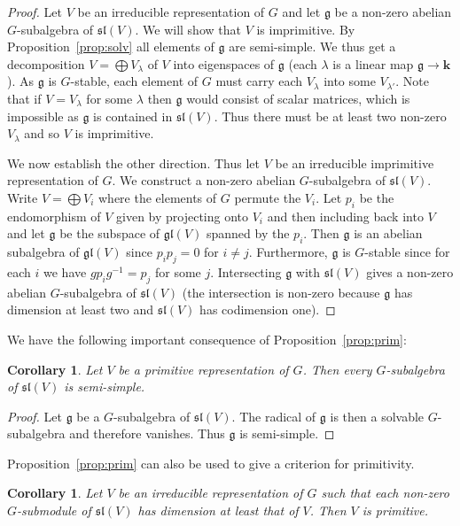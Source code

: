 \documentclass{amsart}
\newtheorem{corollary}[theorem]{Corollary}
\theoremstyle{definition}
\theoremstyle{remark}
\def\fieldk{\mathbf{k}}
\let\mf\mathfrak
\begin{document}
\begin{proof}
Let $V$ be an irreducible representation of $G$ and let $\mf{g}$ be a non-zero abelian $G$-subalgebra of $\mf{sl}(V)$.
We will show that $V$ is imprimitive.  By Proposition~\ref{prop:solv} all elements of $\mf{g}$ are semi-simple.  We
thus get a decomposition $V=\bigoplus V_{\lambda}$ of $V$ into eigenspaces of $\mf{g}$ (each $\lambda$ is a linear map
$\mf{g} \to \fieldk$).  As $\mf{g}$ is $G$-stable, each element of $G$ must carry each $V_{\lambda}$ into some
$V_{\lambda'}$.  Note that if $V=V_{\lambda}$ for some $\lambda$ then $\mf{g}$ would consist of scalar matrices, which
is impossible as $\mf{g}$ is contained in $\mf{sl}(V)$.  Thus there must be at least two non-zero $V_{\lambda}$ and so
$V$ is imprimitive.

We now establish the other direction.  Thus let $V$ be an irreducible imprimitive representation of $G$.  We construct
a non-zero abelian $G$-subalgebra of $\mf{sl}(V)$.  Write $V=\bigoplus V_i$ where the elements of $G$ permute the $V_i$.
Let $p_i$ be the endomorphism of $V$ given by projecting onto $V_i$ and then including back into $V$ and let $\mf{g}$ be
the subspace of $\mf{gl}(V)$ spanned by the $p_i$.  Then $\mf{g}$ is an abelian subalgebra of $\mf{gl}(V)$ since
$p_i p_j=0$ for $i \ne j$.  Furthermore, $\mf{g}$ is $G$-stable since for each $i$ we have $g p_i g^{-1}=p_j$ for some
$j$.  Intersecting $\mf{g}$ with $\mf{sl}(V)$ gives a non-zero abelian $G$-subalgebra of $\mf{sl}(V)$ (the intersection
is non-zero because $\mf{g}$ has dimension at least two and $\mf{sl}(V)$ has codimension one).
\end{proof}

We have the following important consequence of Proposition~\ref{prop:prim}:

\begin{corollary}
\label{cor:prim-ss}
Let $V$ be a primitive representation of $G$.  Then every $G$-subalgebra of $\mf{sl}(V)$ is semi-simple.
\end{corollary}

\begin{proof}
Let $\mf{g}$ be a $G$-subalgebra of $\mf{sl}(V)$.  The radical of $\mf{g}$ is then a solvable $G$-subalgebra and
therefore vanishes.  Thus $\mf{g}$ is semi-simple.
\end{proof}

Proposition~\ref{prop:prim} can also be used to give a criterion for primitivity.

\begin{corollary}
\label{cor:prim-test}
Let $V$ be an irreducible representation of $G$ such that each non-zero $G$-submodule of $\mf{sl}(V)$ has dimension at
least that of $V$.  Then $V$ is primitive.
\end{corollary}
\end{document}
